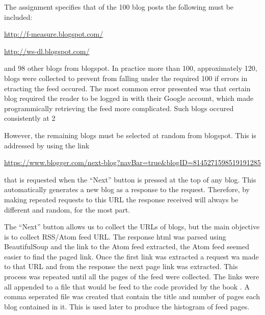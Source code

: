 The assignment specifies that of the 100 blog posts the following must be included:

\vspace{10pt}
\url{http://f-measure.blogspot.com/}

\url{http://ws-dl.blogspot.com/}

\vspace{10pt}

and 98 other blogs from blogspot. In practice more than 100, approximately 120, blogs were collected to prevent from falling under the required 100 if errors in etracting the feed occured. The most common error presented was that certain blog required the reader to be logged in with their Google account, which made programmically retrieving the feed more complicated. Such blogs occured consistently at 2%


However, the remaining blogs must be selected at random from blogspot. This is addressed by using the link 

\vspace{10pt}
\url{https://www.blogger.com/next-blog?navBar=true&blogID=8145271598519191285}

\vspace{10pt}

that is requested when the ``Next'' button is pressed at the top of any blog. This automatically generates a new blog as a response to the request. Therefore, by making repeated requests to this URL the response received will always be different and random, for the most part. 

The ``Next'' button allows us to collect the URLs of blogs, but the main objective is to collect RSS/Atom feed URL. The response html was parsed using BeautifulSoup and the link to the Atom feed extracted, the Atom feed seemed easier to find the paged link. Once the first link was extracted a request wa made to that URL and from the response the next page link was extracted. This process was repeated until all the pages of the feed were collected. The links were all appended to a file that would be feed to the code provided by the book \cite{PCI}. A comma seperated file was created that contain the title and number of pages each blog contained in it. This is used later to produce the histogram of feed pages. 




